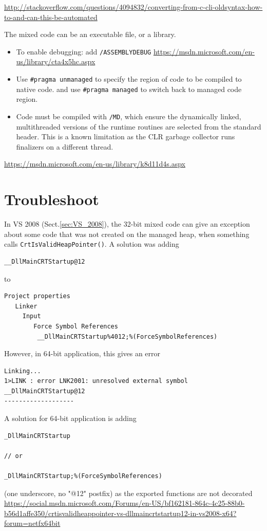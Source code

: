 \url{http://stackoverflow.com/questions/4094832/converting-from-c-cli-oldsyntax-how-to-and-can-this-be-automated}

The mixed code can be an executable file, or a library. 
\begin{itemize}
  \item To enable debugging: add \verb!/ASSEMBLYDEBUG! 
  \url{https://msdn.microsoft.com/en-us/library/cta4x5hc.aspx}
  
  \item Use \verb!#pragma unmanaged! to specify the region of code to be compiled to native code.
  and use \verb!#pragma managed! to switch back to managed code region.
   
  \item Code must be compiled with \verb!/MD!, which ensure 
  the dynamically linked, multithreaded versions of the runtime routines are selected from the standard header. 
  This is a known limitation as the CLR garbage collector runs finalizers on a different thread.
   
\end{itemize}
\url{https://msdn.microsoft.com/en-us/library/k8d11d4s.aspx}

\section{Troubleshoot}


In VS 2008 (Sect.\ref{sec:VS_2008}),  the 32-bit mixed code can give an
exception about some code that was not created on the managed heap, when
something calls \verb!CrtIsValidHeapPointer()!. A solution was
adding 
\begin{verbatim}
__DllMainCRTStartup@12
\end{verbatim}
to 
\begin{verbatim}
Project properties
   Linker 
     Input
        Force Symbol References
         __DllMainCRTStartup%4012;%(ForceSymbolReferences)
\end{verbatim}

However, in 64-bit application, this gives an error
\begin{verbatim}
Linking...
1>LINK : error LNK2001: unresolved external symbol __DllMainCRTStartup@12
-------------------
\end{verbatim}
A solution for 64-bit application is adding
\begin{verbatim}
_DllMainCRTStartup

// or

_DllMainCRTStartup;%(ForceSymbolReferences) 
\end{verbatim}
(one underscore, no "@12" postfix) as the exported functions are not decorated
\url{https://social.msdn.microsoft.com/Forums/en-US/bf162181-864c-4c25-88b0-b56d1affe350/crtisvalidheappointer-vs-dllmaincrtstartup12-in-vs2008-x64?forum=netfx64bit}